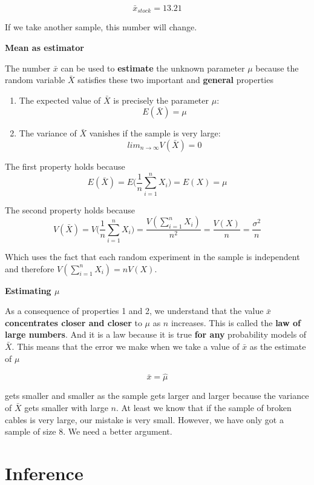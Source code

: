 \documentclass[
]{book}
\providecommand{\tightlist}{%
  \setlength{\itemsep}{0pt}\setlength{\parskip}{0pt}}
\begin{document}
\[\bar{x}_{stock}=13.21\]

If we take another sample, this number will change.

\textbf{Mean as estimator}

The number \(\bar{x}\) can be used to \textbf{estimate} the unknown parameter \(\mu\) because the random variable \(\bar{X}\) satisfies these two important and \textbf{general} properties

\begin{enumerate}
\def\labelenumi{\arabic{enumi})}
\tightlist
\item
  The expected value of \(\bar{X}\) is precisely the parameter \(\mu\): \[E(\bar{X})=\mu\]
\item
  The variance of \(\bar{X}\) vanishes if the sample is very large: \[lim_{n \rightarrow \infty} V(\bar{X}) = 0\]
\end{enumerate}

The first property holds because
\[E(\bar{X})=E\big(\frac{1}{n}\sum_{i=1}^n X_i\big)=E(X)=\mu\]

The second property holds because
\[V(\bar{X})=V\big(\frac{1}{n}\sum_{i=1}^n X_i\big)=\frac{V(\sum_{i=1}^ nX_i)}{n^2}=\frac{V(X)}{n}=\frac{\sigma^2}{n}\]

Which uses the fact that each random experiment in the sample is independent and therefore \(V(\sum_{i=1}^n X_i)=nV(X)\).

\textbf{Estimating \(\mu\)}

As a consequence of properties 1 and 2, we understand that the value \(\bar{x}\) \textbf{concentrates closer and closer} to \(\mu\) as \(n\) increases. This is called the \textbf{law of large numbers}. And it is a law because it is true \textbf{for any} probability models of \(\bar{X}\). This means that the error we make when we take a value of \(\bar{x}\) as the estimate of \(\mu\)

\[\bar{x}=\hat{\mu}\]

gets smaller and smaller as the sample gets larger and larger because the variance of \(\bar{X}\) gets smaller with large \(n\). At least we know that if the sample of broken cables is very large, our mistake is very small. However, we have only got a sample of size \(8\). We need a better argument.

\hypertarget{inference}{%
\section{Inference}\label{inference}}
\end{document}
